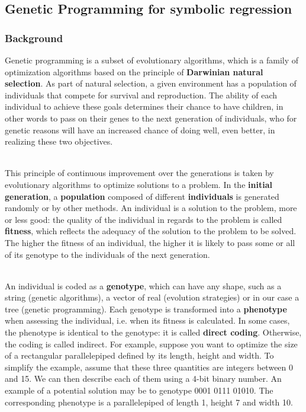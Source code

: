 \subsection{Genetic Programming for symbolic regression}
\subsubsection{Background}
Genetic programming is a subset of evolutionary algorithms, which is a family of optimization algorithms based on the principle of \textbf{Darwinian natural selection}. As part of natural selection, a given environment has a population of individuals that compete for survival and reproduction. The ability of each individual to achieve these goals determines their chance to have children, in other words to pass on their genes to the next generation of individuals, who for genetic reasons will have an increased chance of doing well, even better, in realizing these two objectives.

~~\\
This principle of continuous improvement over the generations is taken by evolutionary algorithms to optimize solutions to a problem. In the \textbf {initial generation}, a \textbf{population} composed of different \textbf {individuals} is generated randomly or by other methods. An individual is a solution to the problem, more or less good: the quality of the individual in regards to the problem is called \textbf{fitness}, which reflects the adequacy of the solution to the problem to be solved. The higher the fitness of an individual, the higher it is likely to pass some or all of its genotype to the individuals of the next generation.

~~\\
An individual is coded as a \textbf{genotype}, which can have any shape, such as a string (genetic algorithms), a vector of real (evolution strategies) or in our case a tree (genetic programming). Each genotype is transformed into a \textbf{phenotype} when assessing the individual, i.e. when its fitness is calculated. In some cases, the phenotype is identical to the genotype: it is called \textbf{direct coding}. Otherwise, the coding is called indirect. For example, suppose you want to optimize the size of a rectangular parallelepiped defined by its length, height and width. To simplify the example, assume that these three quantities are integers between 0 and 15. We can then describe each of them using a 4-bit binary number. An example of a potential solution may be to genotype 0001 0111 01010. The corresponding phenotype is a parallelepiped of length 1, height 7 and width 10.

